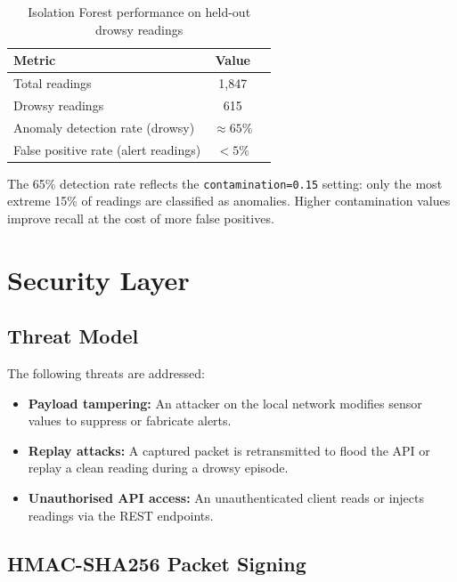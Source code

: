 \documentclass[12pt, a4paper]{article}
\begin{document}
\begin{table}[H]
\centering
\caption{Isolation Forest performance on held-out drowsy readings}
\begin{tabular}{lcc}
\toprule
\textbf{Metric} & \textbf{Value} \\
\midrule
Total readings & 1,847 \\
Drowsy readings & 615 \\
Anomaly detection rate (drowsy) & $\approx 65\%$ \\
False positive rate (alert readings) & $<5\%$ \\
\bottomrule
\end{tabular}
\end{table}

The 65\% detection rate reflects the \texttt{contamination=0.15} setting:
only the most extreme 15\% of readings are classified as anomalies. Higher
contamination values improve recall at the cost of more false positives.

\newpage
\section{Security Layer}
\label{sec:security}

\subsection{Threat Model}

The following threats are addressed:

\begin{itemize}
    \item \textbf{Payload tampering:} An attacker on the local network modifies
          sensor values to suppress or fabricate alerts.
    \item \textbf{Replay attacks:} A captured packet is retransmitted to flood
          the API or replay a clean reading during a drowsy episode.
    \item \textbf{Unauthorised API access:} An unauthenticated client reads or
          injects readings via the REST endpoints.
\end{itemize}

\subsection{HMAC-SHA256 Packet Signing}
\end{document}
